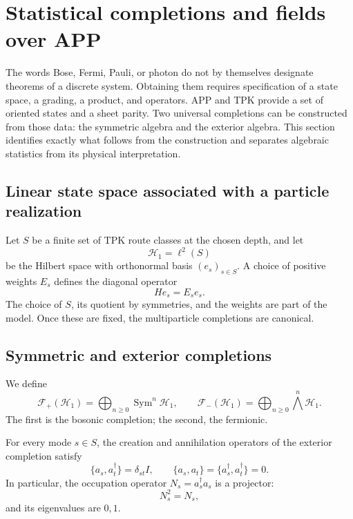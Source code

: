 \chapter{Statistical completions and fields over APP}
\label{chap:completaciones-cuanticas}

The words Bose, Fermi, Pauli, or photon do not by themselves designate theorems of a discrete system. Obtaining them requires specification of a state space, a grading, a product, and operators. APP and TPK provide a set of oriented states and a sheet parity. Two universal completions can be constructed from those data: the symmetric algebra and the exterior algebra. This section identifies exactly what follows from the construction and separates algebraic statistics from its physical interpretation.

\section{Linear state space associated with a particle realization}

Let \(S\) be a finite set of TPK route classes at the chosen depth,
and let
\[
 \mathcal H_1=\ell^2(S)
\]
be the Hilbert space with orthonormal basis \((e_s)_{s\in S}\). A choice of
positive weights \(E_s\) defines the diagonal operator
\[
 He_s=E_se_s.
\]
The choice of \(S\), its quotient by symmetries, and the weights are part
of the model. Once these are fixed, the multiparticle completions are canonical.

\section{Symmetric and exterior completions}

We define
\[
 \mathcal F_+(\mathcal H_1)=
 \bigoplus_{n\geq0}\operatorname{Sym}^n\mathcal H_1,
 \qquad
 \mathcal F_-(\mathcal H_1)=
 \bigoplus_{n\geq0}\bigwedge^n\mathcal H_1.
\]
The first is the bosonic completion; the second, the fermionic.

\begin{theorem}
For every mode \(s\in S\), the creation and annihilation operators of the
exterior completion satisfy
\[
 \{a_s,a_t^\dagger\}=\delta_{st}I,
 \qquad
 \{a_s,a_t\}=\{a_s^\dagger,a_t^\dagger\}=0.
\]
In particular, the occupation operator
\(N_s=a_s^\dagger a_s\) is a projector:
\[
 N_s^2=N_s,
\]
and its eigenvalues are \(0,1\).
\end{theorem}

